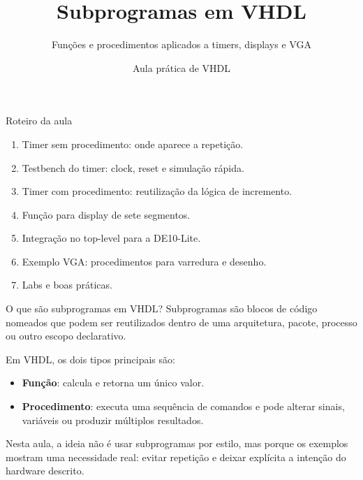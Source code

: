 \documentclass[aspectratio=169,11pt]{beamer}
\title[Subprogramas em VHDL]{Subprogramas em VHDL}
\subtitle{Funções e procedimentos aplicados a timers, displays e VGA}
\author{Aula prática de VHDL}
\institute{Base: arquivos \texttt{Aula009}}
\date{}
\begin{document}
\begin{frame}
    \titlepage
\end{frame}

\begin{frame}{Roteiro da aula}
    \begin{enumerate}
        \item Timer sem procedimento: onde aparece a repetição.
        \item Testbench do timer: clock, reset e simulação rápida.
        \item Timer com procedimento: reutilização da lógica de incremento.
        \item Função para display de sete segmentos.
        \item Integração no top-level para a DE10-Lite.
        \item Exemplo VGA: procedimentos para varredura e desenho.
        \item Labs e boas práticas.
    \end{enumerate}
\end{frame}

\begin{frame}{O que são subprogramas em VHDL?}
    Subprogramas são blocos de código nomeados que podem ser reutilizados dentro de uma arquitetura, pacote, processo ou outro escopo declarativo.

    \vspace{0.5em}

    Em VHDL, os dois tipos principais são:
    \begin{itemize}
        \item \textbf{Função}: calcula e retorna um único valor.
        \item \textbf{Procedimento}: executa uma sequência de comandos e pode alterar sinais, variáveis ou produzir múltiplos resultados.
    \end{itemize}

    \vspace{0.5em}
    Nesta aula, a ideia não é usar subprogramas por estilo, mas porque os exemplos mostram uma necessidade real: evitar repetição e deixar explícita a intenção do hardware descrito.
\end{frame}
\end{document}
